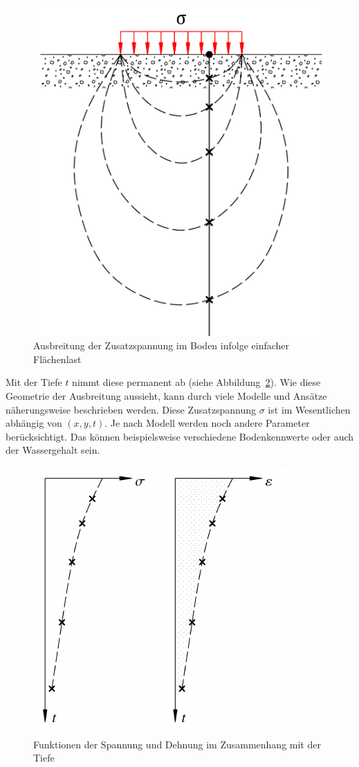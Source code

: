 \begin{figure}
	\centering
	\includegraphics[width=0.4\linewidth,keepaspectratio]{papers/spannung/Grafiken/Bild4.png}
	\caption{Ausbreitung der Zusatzspannung im Boden infolge einfacher Flächenlast}
	\label{fig:Bild4}
\end{figure}

Mit der Tiefe $t$ nimmt diese permanent ab (siehe Abbildung~\ref{fig:Bild5}).
Wie diese Geometrie der Ausbreitung aussieht, kann durch viele Modelle und Ansätze näherungsweise beschrieben werden.
Diese Zusatzspannung $\sigma$ ist im Wesentlichen abhängig von $(x,y,t)$.
Je nach Modell werden noch andere Parameter berücksichtigt.
Das können beispielsweise verschiedene Bodenkennwerte oder auch der Wassergehalt sein.

\begin{figure}
	\centering
	\includegraphics{papers/spannung/images/tiefe.pdf}
	\caption{Funktionen der Spannung und Dehnung im Zusammenhang mit der Tiefe}
	\label{fig:Bild5}
\end{figure}

